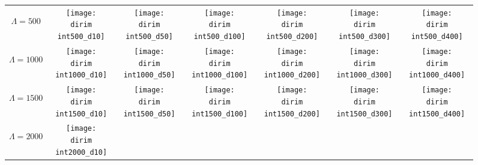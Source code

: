 \begin{figure}[!bt]
	\centering
	\newcommand{\wf}{.13\textwidth}
	\newcommand{\dirim}{\qd gFREM/images/psf3/text_twosources_}
	\newcommand{\vs}{.1}
	\begin{tabular}{c|cccccc}
		\begin{sideways}\hspace{\vs cm}$\Lambda=500$\end{sideways}
		&\texttt{[image: \\dirim int500\_d10]}
		&\texttt{[image: \\dirim int500\_d50]}
		&\texttt{[image: \\dirim int500\_d100]}
		&\texttt{[image: \\dirim int500\_d200]}
		&\texttt{[image: \\dirim int500\_d300]}
		&\texttt{[image: \\dirim int500\_d400]}\\		
		\begin{sideways}\hspace{\vs cm}$\Lambda=1000$\end{sideways}
		&\texttt{[image: \\dirim int1000\_d10]}
		&\texttt{[image: \\dirim int1000\_d50]}
		&\texttt{[image: \\dirim int1000\_d100]}
		&\texttt{[image: \\dirim int1000\_d200]}
		&\texttt{[image: \\dirim int1000\_d300]}
		&\texttt{[image: \\dirim int1000\_d400]}\\
		\begin{sideways}\hspace{\vs cm}$\Lambda=1500$\end{sideways}
		&\texttt{[image: \\dirim int1500\_d10]}
		&\texttt{[image: \\dirim int1500\_d50]}
		&\texttt{[image: \\dirim int1500\_d100]}
		&\texttt{[image: \\dirim int1500\_d200]}
		&\texttt{[image: \\dirim int1500\_d300]}
		&\texttt{[image: \\dirim int1500\_d400]}\\		
		\begin{sideways}\hspace{\vs cm}$\Lambda=2000$\end{sideways}
		&\texttt{[image: \\dirim int2000\_d10]}

\end{tabular}
\end{figure}
